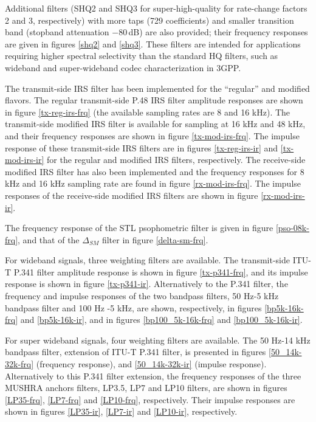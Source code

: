 Additional filters (SHQ2 and SHQ3 for super-high-quality for rate-change factors 2 and 3, respectively) with more taps (729 coefficients) and smaller transition band (stopband attenuation $-80$\,dB) are also provided; their frequency responses are given in figures \ref{shq2} and \ref{shq3}. These filters are intended for applications requiring higher spectral selectivity than the standard HQ filters, such as wideband and super-wideband codec characterization in 3GPP.

The transmit-side IRS filter has been implemented for the ``regular''
and modified flavors. The regular transmit-side P.48 IRS filter
amplitude responses are shown in figure \ref{tx-reg-irs-frq} (the
available sampling rates are 8 and 16 kHz). The transmit-side modified
IRS filter is available for sampling at 16 kHz and 48 kHz, and
their frequency responses are shown in figure \ref{tx-mod-irs-frq}.
The impulse response of these transmit-side IRS filters are in figures
\ref{tx-reg-irs-ir} and \ref{tx-mod-irs-ir} for the regular and
modified IRS filters, respectively. The receive-side modified IRS
filter has also been implemented and the frequency responses for 8 kHz
and 16 kHz sampling rate are found in figure \ref{rx-mod-irs-frq}. The
impulse responses of the receive-side modified IRS filters are shown in
figure \ref{rx-mod-irs-ir}.

The frequency response of the STL psophometric filter is given in
figure \ref{pso-08k-frq}, and that of the $\Delta_{SM}$ filter in figure
\ref{delta-sm-frq}.

For wideband signals, three weighting filters are available. The
transmit-side ITU-T P.341 filter amplitude response is shown in
figure \ref{tx-p341-frq}, and its impulse response is shown in
figure \ref{tx-p341-ir}. Alternatively to the P.341 filter, the
frequency and impulse responses of the two bandpass filters,
50 Hz-5 kHz bandpass filter and 100 Hz -5 kHz, are shown, respectively,
in figures \ref{bp5k-16k-frq} and \ref{bp5k-16k-ir}, and in figures
\ref{bp100_5k-16k-frq} and \ref{bp100_5k-16k-ir}.

For super wideband signals, four weighting filters are available.
The 50 Hz-14 kHz bandpass filter, extension of ITU-T P.341 filter, is
presented in figures \ref{50_14k-32k-frq} (frequency response), and
\ref{50_14k-32k-ir} (impulse response). Alternatively to this P.341
filter extension, the frequency responses of the three MUSHRA
anchors filters, LP3.5, LP7 and LP10 filters, are shown in figures
\ref{LP35-frq}, \ref{LP7-frq} and \ref{LP10-frq}, respectively.
Their impulse responses are shown in figures \ref{LP35-ir},
\ref{LP7-ir} and \ref{LP10-ir}, respectively.

